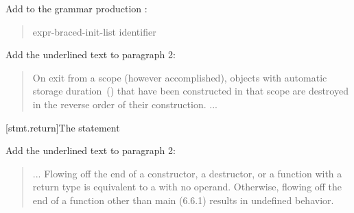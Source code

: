 Add  to the grammar production :

\begin{quote}
  \begin{bnf}
    \br
    \br
    \br
     expr-braced-init-list\opt \terminal{;}\br
     \br
     identifier \terminal{;}
  \end{bnf}
\end{quote}

Add the underlined text to paragraph 2:

\begin{quote}
\setcounter{Paras}{1}
\pnum
On exit from a scope (however accomplished), objects with automatic storage
duration~() that have been constructed in that scope are destroyed
in the reverse order of their construction.
...
\end{quote}

\setcounter{subsection}{2}
[stmt.return]{The  statement}%
%
%

%

Add the underlined text to paragraph 2:

\begin{quote}
\setcounter{Paras}{1}
  \pnum ... Flowing off the end of
  a constructor,
  a destructor, or
  a function  with a \cv{}~ return type is
  equivalent to a  with no operand. Otherwise, flowing off the end of a function other than main (6.6.1) 
  results in undefined behavior.
\end{quote}


